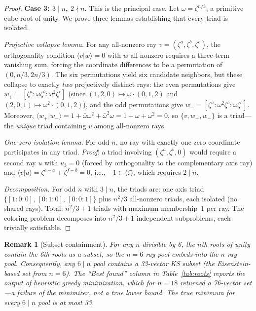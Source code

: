 \documentclass[12pt,a4paper]{article}
\newtheorem{remark}[theorem]{Remark}
\begin{document}
\begin{proof}
\textbf{Case 3: $3 \mid n$, $2 \nmid n$.}  This is the principal case.  Let $\omega = \zeta^{n/3}$, a primitive cube root of unity.  We prove three lemmas establishing that every triad is isolated.

\emph{Projective collapse lemma.}  For any all-nonzero ray $v = (\zeta^a, \zeta^b, \zeta^c)$, the orthogonality condition $\langle v | w \rangle = 0$ with $w$ all-nonzero requires a three-term vanishing sum, forcing the coordinate differences to be a permutation of $(0, n/3, 2n/3)$.  The six permutations yield six candidate neighbors, but these collapse to exactly \emph{two} projectively distinct rays: the even permutations give $w_+ = [\zeta^a : \omega\zeta^b : \omega^2\zeta^c]$ (since $(1{,}2{,}0) \mapsto \omega \cdot (0{,}1{,}2)$ and $(2{,}0{,}1) \mapsto \omega^2 \cdot (0{,}1{,}2)$), and the odd permutations give $w_- = [\zeta^a : \omega^2\zeta^b : \omega\zeta^c]$.  Moreover, $\langle w_+ | w_- \rangle = 1 + \bar\omega\omega^2 + \bar\omega^2\omega = 1 + \omega + \omega^2 = 0$, so $\{v, w_+, w_-\}$ is a triad---the \emph{unique} triad containing $v$ among all-nonzero rays.

\emph{One-zero isolation lemma.}  For odd $n$, no ray with exactly one zero coordinate participates in any triad.  \emph{Proof}: a triad involving $({\zeta^a}, {\zeta^b}, 0)$ would require a second ray $u$ with $u_3 = 0$ (forced by orthogonality to the complementary axis ray) and $\langle v | u \rangle = \zeta^{e-a} + \zeta^{f-b} = 0$, i.e., $-1 \in \langle\zeta\rangle$, which requires $2 \mid n$.

\emph{Decomposition.}  For odd $n$ with $3 \mid n$, the triads are: one axis triad $\{[1{:}0{:}0],\, [0{:}1{:}0],\, [0{:}0{:}1]\}$ plus $n^2/3$ all-nonzero triads, each isolated (no shared rays).  Total: $n^2/3 + 1$ triads with maximum membership~1 per ray.  The coloring problem decomposes into $n^2/3 + 1$ independent subproblems, each trivially satisfiable.
\end{proof}

\begin{remark}[Subset containment]
For any $n$ divisible by 6, the $n$th roots of unity contain the 6th roots as a subset, so the $n=6$ ray pool embeds into the $n$-ray pool. Consequently, any $6\mid n$ pool contains a 33-vector KS subset (the Eisenstein-based set from $n=6$). The ``Best found'' column in Table~\ref{tab:roots} reports the output of heuristic greedy minimization, which for $n=18$ returned a 76-vector set---a failure of the minimizer, not a true lower bound. The true minimum for every $6\mid n$ pool is at most 33.
\end{remark}
\end{document}
